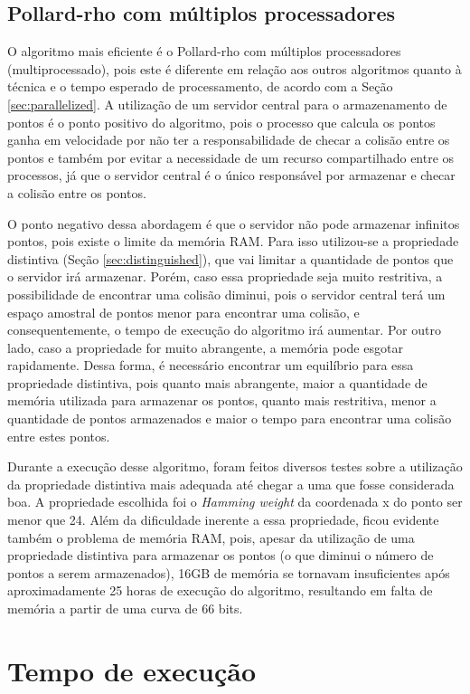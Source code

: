 \subsection{Pollard-rho com múltiplos processadores}
O algoritmo mais eficiente é o Pollard-rho com múltiplos processadores (multiprocessado), pois este é diferente em relação aos outros algoritmos quanto à técnica e o tempo esperado de processamento, de acordo com a Seção \ref{sec:parallelized}. A utilização de um servidor central para o armazenamento de pontos é o ponto positivo do algoritmo, pois o processo que calcula os pontos ganha em velocidade por não ter a responsabilidade de checar a colisão entre os pontos e também por evitar a necessidade de um recurso compartilhado entre os processos, já que o servidor central é o único responsável por armazenar e checar a colisão entre os pontos.

O ponto negativo dessa abordagem é que o servidor não pode armazenar infinitos pontos, pois existe o limite da memória RAM. Para isso utilizou-se a propriedade distintiva (Seção \ref{sec:distinguished}), que vai limitar a quantidade de pontos que o servidor irá armazenar. Porém, caso essa propriedade seja muito restritiva, a possibilidade de encontrar uma colisão diminui, pois o servidor central terá um espaço amostral de pontos menor para encontrar uma colisão, e consequentemente, o tempo de execução do algoritmo irá aumentar. Por outro lado, caso a propriedade for muito abrangente, a memória pode esgotar rapidamente. Dessa forma, é necessário encontrar um equilíbrio para essa propriedade distintiva, pois quanto mais abrangente, maior a quantidade de memória utilizada para armazenar os pontos, quanto mais restritiva, menor a quantidade de pontos armazenados e maior o tempo para encontrar uma colisão entre estes pontos.

Durante a execução desse algoritmo, foram feitos diversos testes sobre a utilização da propriedade distintiva mais adequada até chegar a uma que fosse considerada boa. A propriedade escolhida foi o \textit{Hamming weight} da coordenada x do ponto ser menor que 24. Além da dificuldade inerente a essa propriedade, ficou evidente também o problema de memória RAM, pois, apesar da utilização de uma propriedade distintiva para armazenar os pontos (o que diminui o número de pontos a serem armazenados), 16GB de memória se tornavam insuficientes após aproximadamente 25 horas de execução do algoritmo, resultando em falta de memória a partir de uma curva de 66 bits.

\section{Tempo de execução}
\label{sec:execution_time}

